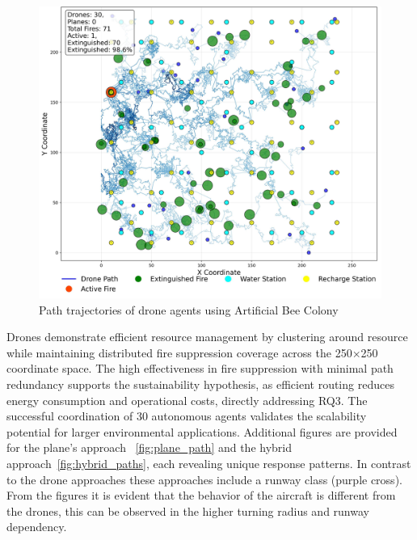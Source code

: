 \documentclass[11pt, a4paper]{article}
\begin{document}
\begin{figure}[htbp]
    \centering
    \includegraphics[width=1\linewidth]{figures/Artificial_Bee_Colony_agent_paths.jpeg}
    \caption{Path trajectories of drone agents using Artificial Bee Colony}
    \label{fig:abc}
\end{figure}

Drones demonstrate efficient resource management by clustering around resource  while maintaining distributed fire suppression coverage across the 250×250 coordinate space. The high effectiveness in fire suppression with minimal path redundancy supports the sustainability hypothesis, as efficient routing reduces energy consumption and operational costs, directly addressing RQ3. The successful coordination of 30 autonomous agents validates the scalability potential for larger environmental applications.
Additional figures are provided for the plane’s approach ~\ref{fig:plane_path} and the hybrid approach~\ref{fig:hybrid_paths}, each revealing unique response patterns. In contrast to the drone approaches these approaches include a runway class (purple cross). From the figures it is evident that the behavior of the aircraft is different from the drones, this can be observed in the higher turning radius and runway dependency.
\end{document}
